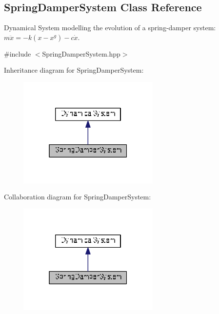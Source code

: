 \hypertarget{classDmpBbo_1_1SpringDamperSystem}{\subsection{Spring\+Damper\+System Class Reference}
\label{classDmpBbo_1_1SpringDamperSystem}
}


Dynamical System modelling the evolution of a spring-\/damper system\+: $ m\ddot{x} = -k(x-x^g) -c\dot{x}$.  




{\ttfamily \#include $<$Spring\+Damper\+System.\+hpp$>$}



Inheritance diagram for Spring\+Damper\+System\+:
\nopagebreak
\begin{figure}[H]
\begin{center}
\leavevmode
\includegraphics[width=199pt]{classDmpBbo_1_1SpringDamperSystem__inherit__graph}
\end{center}
\end{figure}


Collaboration diagram for Spring\+Damper\+System\+:
\nopagebreak
\begin{figure}[H]
\begin{center}
\leavevmode
\includegraphics[width=199pt]{classDmpBbo_1_1SpringDamperSystem__coll__graph}
\end{center}
\end{figure}
